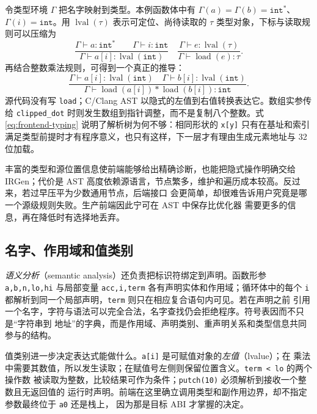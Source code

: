 令类型环境 $\Gamma$ 把名字映射到类型。本例函数体中有
$\Gamma(a)=\Gamma(b)=\mathtt{int}^{*}$、$\Gamma(i)=\mathtt{int}$。用
$\operatorname{lval}(\tau)$ 表示可定位、尚待读取的 $\tau$ 类型对象，下标与读取规则可以压缩为
\[
\frac{\Gamma\vdash a:\mathtt{int}^{*}\qquad
      \Gamma\vdash i:\mathtt{int}}
     {\Gamma\vdash a[i]:\operatorname{lval}(\mathtt{int})}
\quad
\frac{\Gamma\vdash e:\operatorname{lval}(\tau)}
     {\Gamma\vdash \operatorname{load}(e):\tau}.
\]
再结合整数乘法规则，可得到一个真正的推导：
\begin{equation}
\frac{
  \Gamma\vdash a[i]:\operatorname{lval}(\mathtt{int})\quad
  \Gamma\vdash b[i]:\operatorname{lval}(\mathtt{int})
}{
  \Gamma\vdash \operatorname{load}(a[i]) *
                   \operatorname{load}(b[i]):\mathtt{int}
}.
\label{eq:frontend-typing}
\end{equation}
源代码没有写 \texttt{load}；C/Clang AST 以隐式的左值到右值转换表达它。数组实参传给
\texttt{clipped\_dot} 时则发生数组到指针调整，而不是复制八个整数。式
\eqref{eq:frontend-typing} 说明了解析树为何不够：相同形状的 \texttt{x[y]} 只有在基址和索引
满足类型前提时才有程序意义，也只有这样，下一层才有理由生成元素地址与 32 位加载。



丰富的类型和源位置信息使前端能够给出精确诊断，也能把隐式操作明确交给 IRGen；代价是 AST
高度依赖源语言，节点繁多，维护和遍历成本较高。反过来，若过早压平为少数通用节点，后端接口
会更简单，却很难告诉用户究竟是哪一个源级规则失败。生产前端因此宁可在 AST 中保存比优化器
需要更多的信息，再在降低时有选择地丢弃。

\subsection{名字、作用域和值类别}

\emph{语义分析}（semantic analysis）还负责把标识符绑定到声明。函数形参
\texttt{a,b,n,lo,hi} 与局部变量 \texttt{acc,i,term} 各有声明实体和作用域；循环体中的每个
\texttt{i} 都解析到同一个局部声明，\texttt{term} 则只在相应复合语句内可见。若在声明之前
引用一个名字，字符与语法可以完全合法，名字查找仍会拒绝程序。符号表因而不只是“字符串到
地址”的字典，而是作用域、声明类别、重声明关系和类型信息共同参与的结构。

值类别进一步决定表达式能做什么。\texttt{a[i]} 是可赋值对象的\emph{左值}（lvalue）；在
乘法中需要其数值，所以发生读取；在赋值号左侧则保留位置含义。\texttt{term < lo} 的两个操作数
被读取为整数，比较结果可作为条件；\texttt{putch(10)} 必须解析到接收一个整数且无返回值的
运行时声明。前端在这里确立调用类型和副作用边界，却不指定参数最终位于 \texttt{a0} 还是栈上，
因为那是目标 ABI 才掌握的决定。

